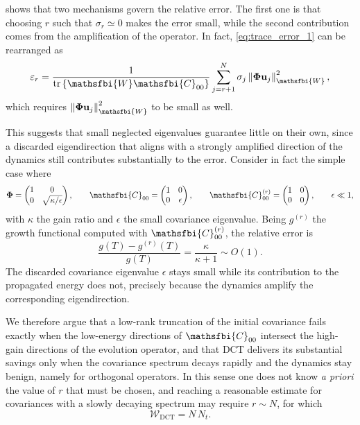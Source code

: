  shows that two mechanisms govern the relative error. The first one is that
choosing \(r\) such that \(\sigma_r\simeq0\) makes the error small, while the second contribution
comes from the amplification of the operator. In fact, \eqref{eq:trace_error_1} can be rearranged as
\begin{equation}
  \varepsilon_r
  =
  \frac{1}{\tr\left\{\mathsfbi{W}\mathsfbi{C}_{00}\right\}}
  \sum_{j=r+1}^{N}
  \sigma_j
  \left\|\boldsymbol{\Phi}\mathbf{u}_j\right\|_{\mathsfbi{W}}^{2},
  \label{eq:trace_error_phi_tail}
\end{equation}
which requires \(\left\|\boldsymbol{\Phi}\mathbf{u}_j\right\|_{\mathsfbi{W}}^{2}\) to be small as
well.

This suggests that small neglected eigenvalues guarantee little on their own, since a discarded
eigendirection that aligns with a strongly amplified direction of the dynamics still contributes
substantially to the error. Consider in fact the simple case where
\begin{equation}
  \boldsymbol{\Phi}
  =
  \begin{pmatrix}
    1 & 0 \\
    0 & \sqrt{\kappa/\epsilon}
  \end{pmatrix},
  \qquad
  \mathsfbi{C}_{00}
  =
  \begin{pmatrix}
    1 & 0 \\
    0 & \epsilon
  \end{pmatrix},
  \qquad
  \mathsfbi{C}_{00}^{(r)}
  =
  \begin{pmatrix}
    1 & 0 \\
    0 & 0
  \end{pmatrix},
  \qquad
  \epsilon \ll 1 ,
  \label{eq:low_rank_failure_example}
\end{equation}
with \(\kappa\) the gain ratio and \(\epsilon\) the small covariance eigenvalue. Being
\(g^{(r)}\) the growth functional computed with \(\mathsfbi{C}_{00}^{(r)}\), the relative error is
\begin{equation}
  \frac{
    g(T)-g^{(r)}(T)
  }{
    g(T)
  }
  =
  \frac{\kappa}{\kappa+1}\sim O(1).
  \label{eq:low_rank_failure_relative_error}
\end{equation}
The discarded covariance eigenvalue \(\epsilon\) stays small while its contribution to the
propagated energy does not, precisely because the dynamics amplify the corresponding
eigendirection.

We therefore argue that a low-rank truncation of the initial covariance fails exactly when the
low-energy directions of \(\mathsfbi{C}_{00}\) intersect the high-gain directions of the evolution
operator, and that DCT delivers its substantial savings only when the covariance spectrum decays
rapidly and the dynamics stay benign, namely for orthogonal operators. In this sense one does not
know \emph{a priori} the value of \(r\) that must be chosen, and reaching a reasonable estimate for
covariances with a slowly decaying spectrum may require \(r\sim N\), for which
\begin{equation}
  \mathcal{W}_{\mathrm{DCT}}=N\,N_t.
  \label{eq:deterministic_full_rank_cost}
\end{equation}


